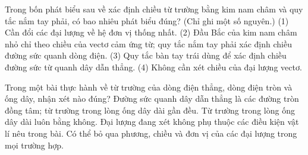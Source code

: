 \begin{ex}
Trong bốn phát biểu sau về xác định chiều từ trường bằng kim nam châm và quy tắc nắm tay phải, có bao nhiêu phát biểu đúng? (Chỉ ghi một số nguyên.) (1) Cần đổi các đại lượng về hệ đơn vị thống nhất. (2) Đầu Bắc của kim nam châm nhỏ chỉ theo chiều của vectơ cảm ứng từ; quy tắc nắm tay phải xác định chiều đường sức quanh dòng điện. (3) Quy tắc bàn tay trái dùng để xác định chiều đường sức từ quanh dây dẫn thẳng. (4) Không cần xét chiều của đại lượng vectơ.
\end{ex}

\begin{ex}
Trong một bài thực hành về từ trường của dòng điện thẳng, dòng điện tròn và ống dây, nhận xét nào đúng?
\choice
{\True Đường sức quanh dây dẫn thẳng là các đường tròn đồng tâm; từ trường trong lòng ống dây dài gần đều.}
{Từ trường trong lòng ống dây dài luôn bằng không.}
{Đại lượng đang xét không phụ thuộc các điều kiện vật lí nêu trong bài.}
{Có thể bỏ qua phương, chiều và đơn vị của các đại lượng trong mọi trường hợp.}
\end{ex}

